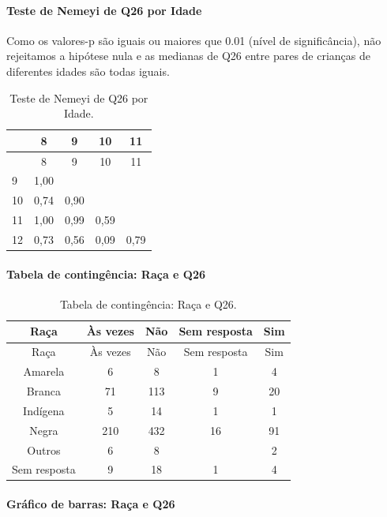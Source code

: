 \documentclass[]{article}
\let\oldparagraph\paragraph
\renewcommand{\paragraph}[1]{\oldparagraph{#1}\mbox{}}
\begin{document}
\hypertarget{teste-de-nemeyi-de-q26-por-idade}{%
\paragraph{Teste de Nemeyi de Q26 por Idade}\label{teste-de-nemeyi-de-q26-por-idade}}

Como os valores-p são iguais ou maiores que 0.01 (nível de significância), não rejeitamos a hipótese nula e as medianas de Q26 entre pares de crianças de diferentes idades são todas iguais.

\begin{longtable}[]{@{}lcccc@{}}
\caption{\label{tab:unnamed-chunk-750}Teste de Nemeyi de Q26 por Idade.}\tabularnewline
\toprule
& 8 & 9 & 10 & 11\tabularnewline
\midrule
\endfirsthead
\toprule
& 8 & 9 & 10 & 11\tabularnewline
\midrule
\endhead
9 & 1,00 & & &\tabularnewline
10 & 0,74 & 0,90 & &\tabularnewline
11 & 1,00 & 0,99 & 0,59 &\tabularnewline
12 & 0,73 & 0,56 & 0,09 & 0,79\tabularnewline
\bottomrule
\end{longtable}

\cleardoublepage

\hypertarget{tabela-de-continguxeancia-rauxe7a-e-q26}{%
\paragraph{Tabela de contingência: Raça e Q26}\label{tabela-de-continguxeancia-rauxe7a-e-q26}}

\begin{longtable}[]{@{}ccccc@{}}
\caption{\label{tab:unnamed-chunk-751}Tabela de contingência: Raça e Q26.}\tabularnewline
\toprule
Raça & Às vezes & Não & Sem resposta & Sim\tabularnewline
\midrule
\endfirsthead
\toprule
Raça & Às vezes & Não & Sem resposta & Sim\tabularnewline
\midrule
\endhead
Amarela & 6 & 8 & 1 & 4\tabularnewline
Branca & 71 & 113 & 9 & 20\tabularnewline
Indígena & 5 & 14 & 1 & 1\tabularnewline
Negra & 210 & 432 & 16 & 91\tabularnewline
Outros & 6 & 8 & & 2\tabularnewline
Sem resposta & 9 & 18 & 1 & 4\tabularnewline
\bottomrule
\end{longtable}

\hypertarget{gruxe1fico-de-barras-rauxe7a-e-q26}{%
\paragraph{Gráfico de barras: Raça e Q26}\label{gruxe1fico-de-barras-rauxe7a-e-q26}}
\end{document}
